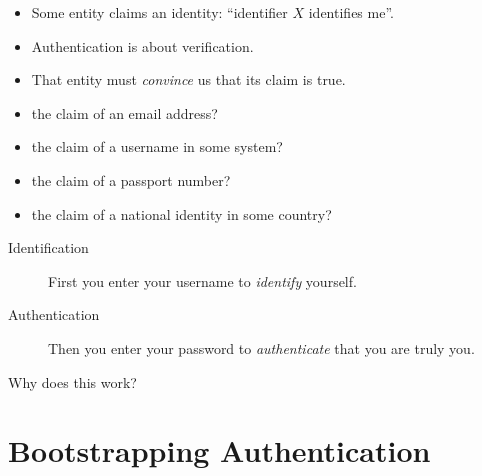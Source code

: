 \begin{frame}
  \begin{definition}[Authentication]
    \begin{itemize}
      \item Some entity claims an identity: \enquote{identifier \(X\) 
          identifies me}.
      \item Authentication is about verification.
      \item That entity must \emph{convince} us that its claim is true.
    \end{itemize}
  \end{definition}

  \pause{}

  \begin{exercise}
    \begin{itemize}
      \item the claim of an email address?
      \item the claim of a username in some system?
      \item the claim of a passport number?
      \item the claim of a national identity in some country?
    \end{itemize}
  \end{exercise}
\end{frame}

\begin{frame}
  \begin{example}
    \begin{description}
      \item[Identification] First you enter your username to \emph{identify} 
        yourself.

      \item[Authentication] Then you enter your password to \emph{authenticate} 
        that you are truly you.
    \end{description}
  \end{example}

  \pause{}

  \begin{exercise}
    Why does this work?
  \end{exercise}
\end{frame}


\section[Bootstrapping]{Bootstrapping Authentication}

